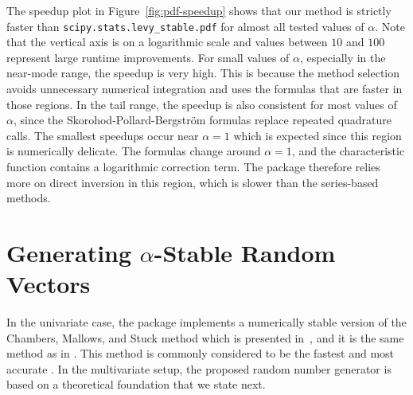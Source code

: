 The speedup plot in Figure~\ref{fig:pdf-speedup} shows that our method is strictly faster than \texttt{scipy.stats.levy\_stable.pdf} for almost all tested values of $\alpha$. Note that the vertical axis is on a logarithmic scale and values between $10$ and $100$ represent large runtime improvements. For small values of $\alpha$, especially in the near-mode range, the speedup is very high. This is because the method selection avoids unnecessary numerical integration and uses the formulas that are faster in those regions. In the tail range, the speedup is also consistent for most values of $\alpha$, since the Skorohod-Pollard-Bergstr{\"o}m  formulas replace repeated quadrature calls. The smallest speedups occur near $\alpha=1$ which is expected since this region is numerically delicate. The formulas change around $\alpha=1$, and the characteristic function contains a logarithmic correction term. The package therefore relies more on direct inversion in this region, which is slower than the series-based methods.




\section{Generating $\alpha$-Stable Random Vectors}

In the univariate case, the package implements a numerically stable version of the Chambers, Mallows, and Stuck method which is presented in~\cite{NolanJohnP2020USDM,WERON1996165}, and it is the same method as in \cite{Royuela-del-ValJavier2017l:FP,teimouri2018alphastablerpackagemodelling}. This method is commonly considered to be the fastest and most accurate \cite{Weron2004Computationally}. In the multivariate setup, the proposed random number generator is based on a theoretical foundation that we state next.


